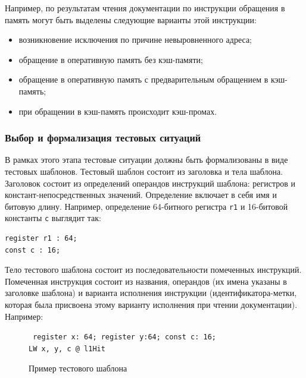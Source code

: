 Например, по результатам чтения документации по инструкции обращения в память могут быть выделены следующие варианты этой инструкции:
\begin{itemize}
    \item возникновение исключения по причине невыровненного адреса;
    \item обращение в оперативную память без кэш-памяти;
    \item обращение в оперативную память с предварительным обращением в кэш-память;
    \item при обращении в кэш-память происходит кэш-промах.
\end{itemize}


\subsubsection{Выбор и формализация тестовых ситуаций}%

В рамках этого этапа тестовые ситуации должны быть формализованы в виде тестовых шаблонов. Тестовый шаблон состоит из заголовка и тела шаблона. Заголовок состоит из определений операндов инструкций шаблона: регистров и констант-непосредственных значений. Определение включает в себя имя и битовую длину. Например, определение 64-битного регистра \texttt{r1} и 16-битовой константы \texttt{c} выглядит так:
\begin{verbatim}
register r1 : 64;
const c : 16;
\end{verbatim}
Тело тестового шаблона состоит из последовательности помеченных инструкций. Помеченная инструкция состоит из названия, операндов (их имена указаны в заголовке шаблона) и варианта исполнения инструкции (идентификатора-метки, которая была присвоена этому варианту исполнения при чтении документации). Например:

\begin{figure}[h]
{ \tt
register x: 64; register y:64; const c: 16;\\
LW x, y, c @ l1Hit }
\caption{Пример тестового шаблона}\label{test_template_exmp1}
\end{figure}

